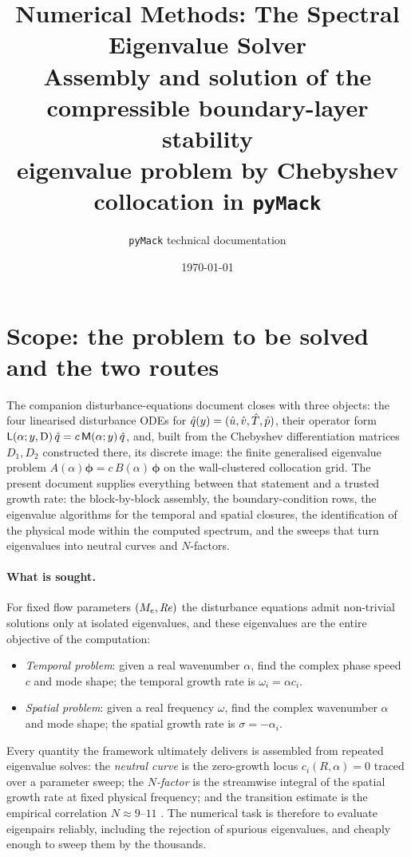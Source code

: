 \documentclass[11pt]{article}
\title{\textbf{Numerical Methods: The Spectral Eigenvalue Solver}\\[3pt]
\large Assembly and solution of the compressible boundary-layer stability\\
eigenvalue problem by Chebyshev collocation in \texttt{pyMack}}
\author{\texttt{pyMack} technical documentation}
\date{\today}
\begin{document}
\maketitle
\tableofcontents
\bigskip

\section{Scope: the problem to be solved and the two routes}\label{sec:scope}
The companion disturbance-equations document closes with three objects: the
four linearised disturbance ODEs for $\hat{q}(y)=(\hat{u},\hat{v},\hat{T},\hat{p})$, their operator form
$\mathsf L(\alpha;y,\mathrm{D})\,\hat{q}=c\,\mathsf M(\alpha;y)\,\hat{q}$, and, built from the Chebyshev
differentiation matrices $D_1,D_2$ constructed there, its discrete image: the finite generalised
eigenvalue problem $A(\alpha)\boldsymbol\phi=c\,B(\alpha)\,\boldsymbol\phi$ on the wall-clustered
collocation grid. The present document supplies everything between that statement and a trusted
growth rate: the block-by-block assembly, the boundary-condition rows, the eigenvalue algorithms
for the temporal and spatial closures, the identification of the physical mode within the computed
spectrum, and the sweeps that turn eigenvalues into neutral curves and $N$-factors.

\paragraph{What is sought.} For fixed flow parameters $(M_e,\mathit{Re})$ the disturbance equations admit
non-trivial solutions only at isolated eigenvalues, and these eigenvalues are the entire objective of
the computation:
\begin{itemize}[nosep,leftmargin=1.6em]
  \item \emph{Temporal problem}: given a real wavenumber $\alpha$, find the complex phase speed $c$
        and mode shape; the temporal growth rate is $\omega_i=\alpha c_i$.
  \item \emph{Spatial problem}: given a real frequency $\omega$, find the complex wavenumber
        $\alpha$ and mode shape; the spatial growth rate is $\sigma=-\alpha_i$.
\end{itemize}
Every quantity the framework ultimately delivers is assembled from repeated eigenvalue solves: the
\emph{neutral curve} is the zero-growth locus $c_i(R,\alpha)=0$ traced over a parameter sweep; the
\emph{$N$-factor} is the streamwise integral of the spatial growth rate at fixed physical frequency;
and the transition estimate is the empirical correlation $N\approx9$--$11$
\cite{smith1956,vaningen1956}. The numerical task is therefore to evaluate eigenpairs reliably,
including the rejection of spurious eigenvalues, and cheaply enough to sweep them by the thousands.
\end{document}
